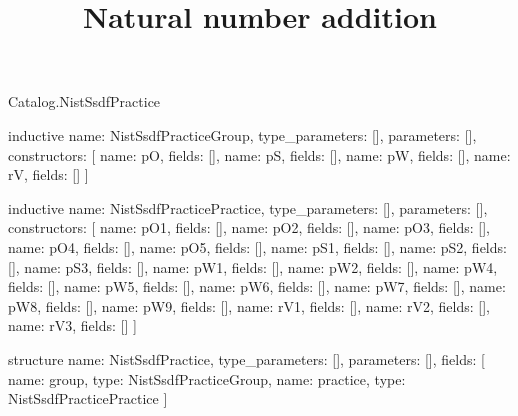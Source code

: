 \begin{lexlean}{Catalog.NistSsdfPractice}
\title{Natural number addition}
\begin{semanticmodule}
inductive{
  name: NistSsdfPracticeGroup,
  type_parameters: [],
  parameters: [],
  constructors: [
    {name: pO, fields: []},
    {name: pS, fields: []},
    {name: pW, fields: []},
    {name: rV, fields: []}
  ]
}

inductive{
  name: NistSsdfPracticePractice,
  type_parameters: [],
  parameters: [],
  constructors: [
    {name: pO1, fields: []},
    {name: pO2, fields: []},
    {name: pO3, fields: []},
    {name: pO4, fields: []},
    {name: pO5, fields: []},
    {name: pS1, fields: []},
    {name: pS2, fields: []},
    {name: pS3, fields: []},
    {name: pW1, fields: []},
    {name: pW2, fields: []},
    {name: pW4, fields: []},
    {name: pW5, fields: []},
    {name: pW6, fields: []},
    {name: pW7, fields: []},
    {name: pW8, fields: []},
    {name: pW9, fields: []},
    {name: rV1, fields: []},
    {name: rV2, fields: []},
    {name: rV3, fields: []}
  ]
}

structure{
  name: NistSsdfPractice,
  type_parameters: [],
  parameters: [],
  fields: [
    {name: group, type: NistSsdfPracticeGroup},
    {name: practice, type: NistSsdfPracticePractice}
  ]
}
\end{semanticmodule}
\end{lexlean}
